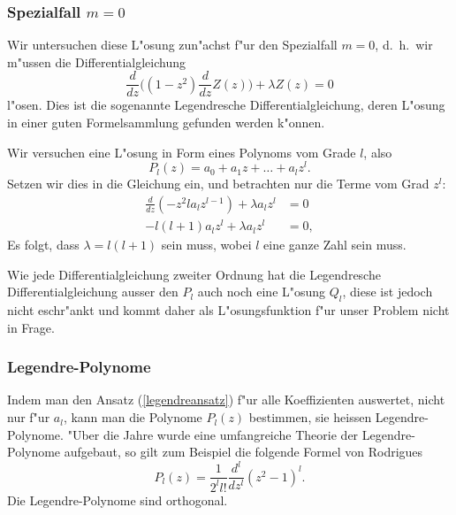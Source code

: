 \subsubsection{Spezialfall $m=0$}
Wir untersuchen diese L"osung zun"achst f"ur den Spezialfall $m=0$,
d.~h.~wir m"ussen die Differentialgleichung
\begin{equation}
\frac{d}{dz}\biggl(
(1-z^2)\frac{d}{dz}Z(z)
\biggr)
+\lambda Z(z)=0
\end{equation}
l"osen.
Dies ist die sogenannte Legendresche Differentialgleichung,
deren L"osung in einer guten Formelsammlung gefunden werden k"onnen.

Wir versuchen eine L"osung in Form eines Polynoms vom
Grade $l$, also 
\begin{equation}
P_l(z)=a_0+a_1z+\dots+a_lz^l.
\label{legendreansatz}
\end{equation}
Setzen wir dies in die Gleichung ein, und betrachten nur die
Terme vom Grad $z^l$:
\begin{align*}
\frac{d}{dz}(-z^2la_lz^{l-1})
+
\lambda a_lz^l&=0
\\
-l(l+1)a_lz^l+\lambda a_lz^l&=0,
\end{align*}
Es folgt, dass $\lambda = l(l+1)$ sein muss, wobei $l$ eine ganze
Zahl sein muss.

Wie jede Differentialgleichung zweiter Ordnung hat die Legendresche
Differentialgleichung ausser den $P_l$ auch noch eine L"osung
$Q_l$, diese ist jedoch nicht eschr"ankt und kommt daher als L"osungsfunktion
f"ur unser Problem nicht in Frage.

\subsubsection{Legendre-Polynome}
Indem man den Ansatz (\ref{legendreansatz}) f"ur alle Koeffizienten
auswertet, nicht nur f"ur $a_l$, kann man die Polynome $P_l(z)$ 
bestimmen, sie heissen Legendre-Polynome.
"Uber die Jahre wurde eine umfangreiche Theorie der Legendre-Polynome
aufgebaut, so gilt zum Beispiel die folgende Formel von Rodrigues
\[
P_l(z)=\frac1{2^ll!}\frac{d^l}{dz^l}(z^2 - 1)^l.
\]
Die Legendre-Polynome sind orthogonal.


